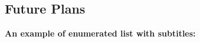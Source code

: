 \subsection{Future Plans}
\lipsum[20]

\textbf{An example of enumerated list with subtitles:}
\begin{description}[style=nextline,labelindent=0.5cm]
    \item[1. Argument or conclusion] \lipsum[17] 
    \item[2. Argument or conclusion] \lipsum[18]
\end{description}


\newpage